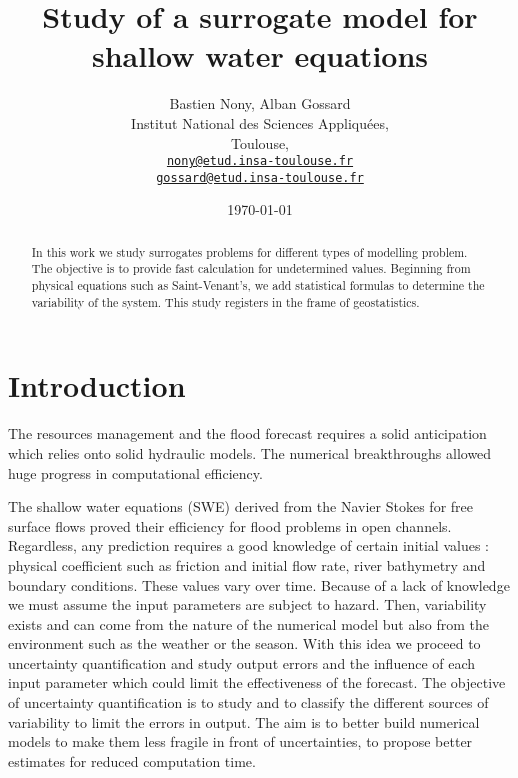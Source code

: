 \documentclass[hidelinks,12pt]{article}
\begin{document}
\title{Study of a surrogate model for shallow water equations}
\author{Bastien Nony, Alban Gossard\\
Institut National des Sciences Appliquées,\\
Toulouse,\\
\href{mailto:nony@etud.insa-toulouse.fr}{   \texttt{nony@etud.insa-toulouse.fr}}\\
\href{mailto:gossard@etud.insa-toulouse.fr}{   \texttt{gossard@etud.insa-toulouse.fr}}}
\date{\today}

\maketitle

\begin{abstract}
In this work we study surrogates problems for different types of modelling problem. The objective is to provide fast calculation for undetermined values. Beginning from physical equations such as Saint-Venant's, we add statistical formulas to determine the variability of the system. This study registers in the frame of geostatistics.
\end{abstract}

\newpage

\tableofcontents

\section{Introduction}

The resources management and the flood forecast requires a solid anticipation which relies onto solid hydraulic models. The numerical breakthroughs allowed huge progress in computational efficiency.

The shallow water equations (SWE) derived from the Navier Stokes for free surface flows proved their efficiency for flood problems in open channels. Regardless, any prediction requires a good knowledge of certain initial values : physical coefficient such as friction and initial flow rate, river bathymetry and boundary conditions. These values vary over time. Because of a lack of knowledge we must assume the input parameters are subject to hazard. Then, variability exists and can come from the nature of the numerical model but also from the environment such as the weather or the season. With this idea we proceed to uncertainty quantification and study output errors and the influence of each input parameter which could limit the effectiveness of the forecast. The objective of uncertainty quantification is to study and to classify the different sources of variability to limit the errors in output. The aim is to better build numerical models to make them less fragile in front of uncertainties, to propose better estimates for reduced computation time.
\end{document}
